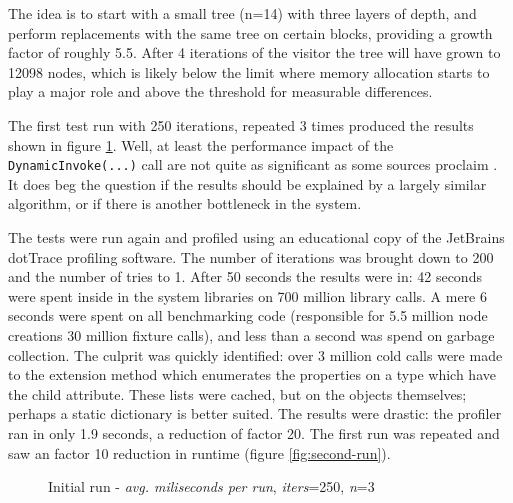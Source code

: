 \documentclass[twoside,openright]{uva-bachelor-thesis}
\newcommand{\code}[1]{\texttt{\footnotesize#1}}
\begin{document}
			The idea is to start with a small tree (n=14) with three layers of depth, and perform replacements with the same tree on certain blocks, providing a growth factor of roughly 5.5. After 4 iterations of the visitor the tree will have grown to 12098 nodes, which is likely below the limit where memory allocation starts to play a major role and above the threshold for measurable differences.
			
			The first test run with 250 iterations, repeated 3 times produced the results shown in figure \ref{fig:first-run}. Well, at least the performance impact of the \code{DynamicInvoke(...)} call are not quite as significant as some sources proclaim \cite{website:msdn-reflection}. It does beg the question if the results should be explained by a largely similar algorithm, or if there is another bottleneck in the system.
			
			The tests were run again and profiled using an educational copy of the JetBrains dotTrace profiling software. The number of iterations was brought down to 200 and the number of tries to 1. After 50 seconds the results were in: 42 seconds were spent inside in the system libraries on 700 million library calls. A mere 6 seconds were spent on all benchmarking code (responsible for 5.5 million node creations 30 million fixture calls), and less than a second was spend on garbage collection. The culprit was quickly identified: over 3 million cold calls were made to the extension method which enumerates the properties on a type which have the child attribute. These lists were cached, but on the objects themselves; perhaps a static dictionary is better suited. The results were drastic: the profiler ran in only 1.9 seconds, a reduction of factor 20. The first run was repeated and saw an factor 10 reduction in runtime (figure \ref{fig:second-run}).
												
			\begin{figure}
				\centering
				\caption{Initial run - \emph{avg. miliseconds per run}, \emph{iters}=250, \emph{n}=3}
				\label{fig:first-run}
			\end{figure}
			
\end{document}
